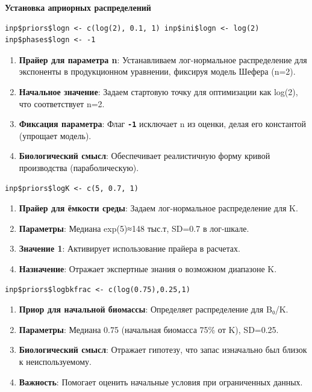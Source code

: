 \documentclass[
  letterpaper,
  DIV=11,
  numbers=noendperiod]{scrreprt}
\begin{document}
\textbf{Установка априорных распределений}

\begin{verbatim}
inp$priors$logn <- c(log(2), 0.1, 1) inp$ini$logn <- log(2) inp$phases$logn <- -1
\end{verbatim}

\begin{enumerate}
\def\labelenumi{\arabic{enumi}.}
\item
  \textbf{Прайер для параметра n}: Устанавливаем лог-нормальное
  распределение для экспоненты в продукционном уравнении, фиксируя
  модель Шефера (n=2).
\item
  \textbf{Начальное значение}: Задаем стартовую точку для оптимизации
  как log(2), что соответствует n=2.
\item
  \textbf{Фиксация параметра}: Флаг \textbf{\texttt{-1}} исключает n из
  оценки, делая его константой (упрощает модель).
\item
  \textbf{Биологический смысл}: Обеспечивает реалистичную форму кривой
  производства (параболическую).
\end{enumerate}

\begin{verbatim}
inp$priors$logK <- c(5, 0.7, 1)
\end{verbatim}

\begin{enumerate}
\def\labelenumi{\arabic{enumi}.}
\item
  \textbf{Прайер для ёмкости среды}: Задаем лог-нормальное распределение
  для K.
\item
  \textbf{Параметры}: Медиана exp(5)≈148 тыс.т, SD=0.7 в лог-шкале.
\item
  \textbf{Значение 1}: Активирует использование прайера в расчетах.
\item
  \textbf{Назначение}: Отражает экспертные знания о возможном диапазоне
  K.
\end{enumerate}

\begin{verbatim}
inp$priors$logbkfrac <- c(log(0.75),0.25,1)
\end{verbatim}

\begin{enumerate}
\def\labelenumi{\arabic{enumi}.}
\item
  \textbf{Приор для начальной биомассы}: Определяет распределение для
  B₀/K.
\item
  \textbf{Параметры}: Медиана 0.75 (начальная биомасса 75\% от K),
  SD=0.25.
\item
  \textbf{Биологический смысл}: Отражает гипотезу, что запас изначально
  был близок к неиспользуемому.
\item
  \textbf{Важность}: Помогает оценить начальные условия при ограниченных
  данных.
\end{enumerate}
\end{document}
